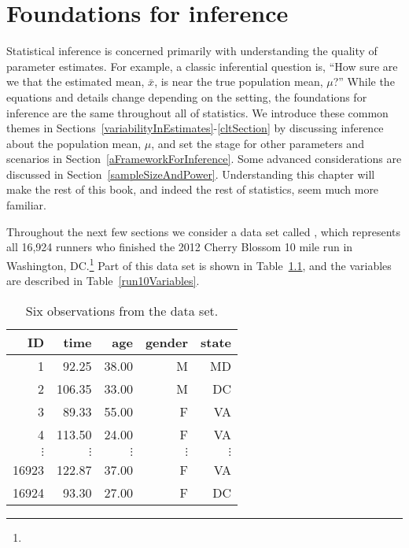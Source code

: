  \chapter{Foundations for inference}
\label{foundationsForInference}

Statistical inference is concerned primarily with understanding the quality of parameter estimates. For example, a classic inferential question is, ``How sure are we that the estimated mean, $\bar{x}$, is near the true population mean, $\mu$?'' While the equations and details change depending on the setting, the foundations for inference are the same throughout all of statistics. We introduce these common themes in Sections~\ref{variabilityInEstimates}-\ref{cltSection} by discussing inference about the population mean, $\mu$, and set the stage for other parameters and scenarios in Section~\ref{aFrameworkForInference}. Some advanced considerations are discussed in Section~\ref{sampleSizeAndPower}. Understanding this chapter will make the rest of this book, and indeed the rest of statistics, seem much more familiar.


Throughout the next few sections we consider a data set called , which represents all 16,924 runners who finished the 2012 Cherry Blossom 10 mile run in Washington, DC.\footnote{} Part of this data set is shown in Table~\ref{run10DF}, and the variables are described in Table~\ref{run10Variables}.

\begin{table}[h]
\centering
\begin{tabular}{rrrrr}
  \hline
ID & time & age & gender & state \\ 
  \hline
1 & 92.25 & 38.00 & M & MD \\ 
2 & 106.35 & 33.00 & M & DC \\ 
3 & 89.33 & 55.00 & F & VA \\ 
4 & 113.50 & 24.00 & F & VA \\ 
$\vdots$ & $\vdots$ & $\vdots$ & $\vdots$ & $\vdots$ \\
16923 & 122.87 & 37.00 & F & VA \\ 
16924 & 93.30 & 27.00 & F & DC \\ 
   \hline
\end{tabular}
\caption{Six observations from the  data set.}
\label{run10DF}
\end{table}

